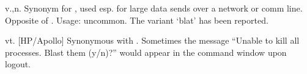 
\begin{inparaenum}
\item v.,n. Synonym for , used esp. for large data sends over
    a network or comm line. Opposite of . Usage: uncommon.
    The variant `blat' has been reported.
\item vt. [HP/Apollo] Synonymous with . Sometimes the
    message ``Unable to kill all processes. Blast them (y/n)?'' would appear
    in the command window upon logout.
\end{inparaenum}

